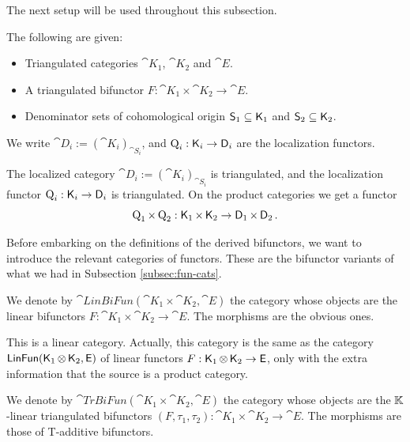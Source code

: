 The next setup will be used throughout this subsection.

\begin{setup} \label{set:1976}
The following are given: 
\begin{itemize}
\item Triangulated categories $\cat{K}_1$, $\cat{K}_2$ and $\cat{E}$.

\item A triangulated bifunctor 
$F : \cat{K}_1 \times \cat{K}_2 \to \cat{E}$.

\item Denominator sets of cohomological origin
$\operatorname{\mathsf{S}}_1 \subseteq \operatorname{\mathsf{K}}_1$ and $\operatorname{\mathsf{S}}_2 \subseteq \operatorname{\mathsf{K}}_2$.
\end{itemize}
We write $\cat{D}_i := (\cat{K}_i)_{\cat{S}_i}$, 
and $\operatorname{Q}_i : \operatorname{\mathsf{K}}_i \to \operatorname{\mathsf{D}}_i$ are the localization functors.
\end{setup}

The localized category 
$\cat{D}_i := (\cat{K}_i)_{\cat{S}_i}$
is triangulated, and the localization functor 
$\operatorname{Q}_i : \operatorname{\mathsf{K}}_i \to \operatorname{\mathsf{D}}_i$
is triangulated. On the product categories we get a functor 
\[ \operatorname{Q}_1 \times \operatorname{Q}_2 : 
\operatorname{\mathsf{K}}_1 \times \operatorname{\mathsf{K}}_2 \to \operatorname{\mathsf{D}}_1 \times \operatorname{\mathsf{D}}_2 . \]

Before embarking on the definitions of the derived bifunctors, we want to 
introduce the relevant categories of functors. These are the bifunctor variants 
of what we had in Subsection \ref{subsec:fun-cats}. 

\begin{dfn} \label{dfn:3130} 
We denote by 
$\cat{LinBiFun}(\cat{K}_1 \times \cat{K}_2, \cat{E})$
the category whose objects are the linear bifunctors 
$F : \cat{K}_1 \times \cat{K}_2 \to \cat{E}$.
The morphisms are the obvious ones. 
\end{dfn}

This is a linear category. Actually, this category is the same as the category 
$\operatorname{\mathsf{LinFun}}(\operatorname{\mathsf{K}}_1 \otimes \operatorname{\mathsf{K}}_2, \operatorname{\mathsf{E}})$ 
of linear functors
$F : \operatorname{\mathsf{K}}_1 \otimes \operatorname{\mathsf{K}}_2 \to \operatorname{\mathsf{E}}$, 
only with the extra information that the source is a product category.
     
\begin{dfn} \label{dfn:2036}
We denote by 
$\cat{TrBiFun}(\cat{K}_1 \times \cat{K}_2, \cat{E})$
the category whose objects are the $\mathbb{K}$-linear triangulated bifunctors 
$(F, \tau_1, \tau_2) : \cat{K}_1 \times \cat{K}_2 \to \cat{E}$.
The morphisms are those of T-additive bifunctors. 
\end{dfn}

